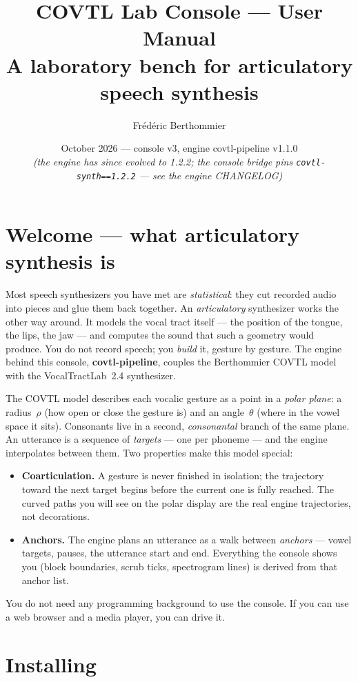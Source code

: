\documentclass[11pt,a4paper]{article}
\title{COVTL Lab Console --- User Manual\\[4pt]\large A laboratory bench for articulatory speech synthesis}
\author{Fr\'ed\'eric Berthommier}
\date{October 2026 --- console v3, engine covtl-pipeline v1.1.0\\[0.2em]\footnotesize\textit{(the engine has since evolved to 1.2.2; the console bridge pins \texttt{covtl-synth==1.2.2} --- see the engine CHANGELOG)}}
\begin{document}
\maketitle
\tableofcontents
\vspace{1em}

\section{Welcome --- what articulatory synthesis is}

Most speech synthesizers you have met are \emph{statistical}: they cut
recorded audio into pieces and glue them back together. An
\emph{articulatory} synthesizer works the other way around. It models the
vocal tract itself --- the position of the tongue, the lips, the jaw --- and
computes the sound that such a geometry would produce. You do not record
speech; you \emph{build} it, gesture by gesture. The engine behind this
console, \textbf{covtl-pipeline}, couples the Berthommier COVTL model with
the VocalTractLab~2.4 synthesizer.

The COVTL model describes each vocalic gesture as a point in a
\emph{polar plane}: a radius~$\rho$ (how open or close the gesture is) and
an angle~$\theta$ (where in the vowel space it sits). Consonants live in a
second, \emph{consonantal} branch of the same plane. An utterance is a
sequence of \emph{targets} --- one per phoneme --- and the engine
interpolates between them. Two properties make this model special:

\begin{itemize}
\item \textbf{Coarticulation.} A gesture is never finished in isolation;
  the trajectory toward the next target begins before the current one is
  fully reached. The curved paths you will see on the polar display are
  the real engine trajectories, not decorations.
\item \textbf{Anchors.} The engine plans an utterance as a walk between
  \emph{anchors} --- vowel targets, pauses, the utterance start and end.
  Everything the console shows you (block boundaries, scrub ticks,
  spectrogram lines) is derived from that anchor list.
\end{itemize}

You do not need any programming background to use the console. If you can
use a web browser and a media player, you can drive it.

\section{Installing}
\end{document}

